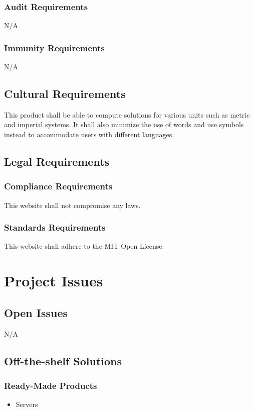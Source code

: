 \documentclass[11pt, oneside]{article}
\begin{document}
\subsubsection{Audit Requirements}
N/A


\subsubsection{Immunity Requirements}
N/A


\subsection{Cultural Requirements}
This product shall be able to compute solutions for various units such as metric and imperial systems. It shall also minimize the use of words and use symbols instead to accommodate users with different languages.


\subsection{Legal Requirements}
\subsubsection{Compliance Requirements}
This website shall not compromise any laws.


\subsubsection{Standards Requirements}
This website shall adhere to the MIT Open License.


\newpage
\section{Project Issues}
\subsection{Open Issues}
N/A


\subsection{Off-the-shelf Solutions}
\subsubsection{Ready-Made Products}
\begin{itemize}
\item Servers
\end{itemize}
\end{document}
